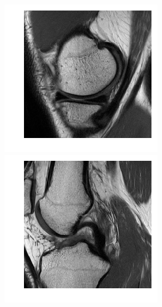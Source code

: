 \begin{figure}[H]
  \includegraphics[width=\linewidth]{imgs/transfer_pers_x1.png}
\endminipage\hfill
{}
  \includegraphics[width=\linewidth]{imgs/transfer_pers_x2.png}

\end{figure}
